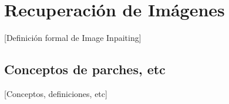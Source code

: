 \chapter{Recuperaci\'on de Imágenes}\label{chapter:ImIp} %
[Definición formal de Image Inpaiting]

\section{Conceptos de parches, etc}
[Conceptos, definiciones, etc]

%	


